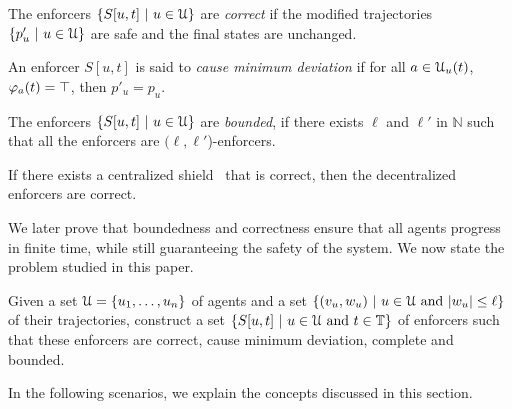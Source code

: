 \begin{defn}[Correctness]
\label{defn:correct}
The enforcers $\{S[u,t]~|~u \in \mathcal{U} \}$ are \emph{correct} if the modified trajectories $\{p'_{u}~|~ u \in \mathcal{U}\}$  are safe and the final states are unchanged.
\end{defn}

\begin{defn}
\label{defn:minimal}
An enforcer $S[u,t]$ is said to \emph{cause minimum deviation} if for all $a \in \mathcal{U}_u(t)$, $\varphi_a(t) = \top$, then $p'_u = p_u$.
\end{defn}

\begin{defn}[Boundedness]
\label{defn:bounded}
The enforcers $\{S[u,t]~|~u \in \mathcal{U}\}$ are \emph{bounded}, if there exists $\ell$ and  $\ell'$ in $\mathbb{N}$ such that all the enforcers are $(\ell,\ell'$)-enforcers. 
\end{defn}

\begin{defn}[Completeness]
\label{defn:complete}
If there exists a centralized shield~\cite{bloem2014sat} that is correct, then the decentralized enforcers are correct.
\end{defn}

 
We later prove that boundedness and correctness ensure that all agents progress in finite time, while still guaranteeing the safety of the system. We now state the problem studied in this paper.


Given a set $\mathcal{U} = \{u_1,\dots,u_n\}$ of agents and a set $\{(v_u,w_u)~|~u \in \mathcal{U} \text{ and } |w_u| \leq \ell \}$ of their trajectories, 
construct a set $\{S[u,t]~|~u \in \mathcal{U} \text{ and } t \in \mathbb{T}\}$ of enforcers such that these enforcers are correct, cause minimum deviation, complete and bounded. 


In the following scenarios, we explain the concepts discussed in this section.

